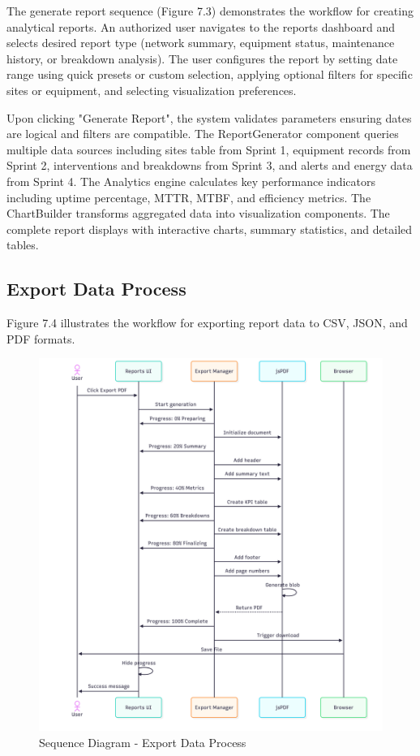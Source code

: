 The generate report sequence (Figure 7.3) demonstrates the workflow for creating analytical reports. An authorized user navigates to the reports dashboard and selects desired report type (network summary, equipment status, maintenance history, or breakdown analysis). The user configures the report by setting date range using quick presets or custom selection, applying optional filters for specific sites or equipment, and selecting visualization preferences.

Upon clicking "Generate Report", the system validates parameters ensuring dates are logical and filters are compatible. The ReportGenerator component queries multiple data sources including sites table from Sprint 1, equipment records from Sprint 2, interventions and breakdowns from Sprint 3, and alerts and energy data from Sprint 4. The Analytics engine calculates key performance indicators including uptime percentage, MTTR, MTBF, and efficiency metrics. The ChartBuilder transforms aggregated data into visualization components. The complete report displays with interactive charts, summary statistics, and detailed tables.

\subsection{Export Data Process}

Figure 7.4 illustrates the workflow for exporting report data to CSV, JSON, and PDF formats.

\begin{figure}[H]
    \centering
    \includegraphics[width=0.95\linewidth]{img/chap_07/sprint5_sequence_export.png}
    \caption{Sequence Diagram - Export Data Process}
    \label{fig:sequence_export_data}
\end{figure}

